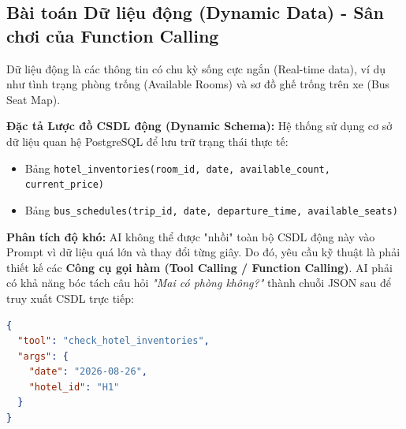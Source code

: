 \subsection{Bài toán Dữ liệu động (Dynamic Data) - Sân chơi của Function Calling}
Dữ liệu động là các thông tin có chu kỳ sống cực ngắn (Real-time data), ví dụ như tình trạng phòng trống (Available Rooms) và sơ đồ ghế trống trên xe (Bus Seat Map).

\textbf{Đặc tả Lược đồ CSDL động (Dynamic Schema):} Hệ thống sử dụng cơ sở dữ liệu quan hệ PostgreSQL để lưu trữ trạng thái thực tế:
\begin{itemize}
    \item Bảng \texttt{hotel\_inventories(room\_id, date, available\_count, current\_price)}
    \item Bảng \texttt{bus\_schedules(trip\_id, date, departure\_time, available\_seats)}
\end{itemize}

\textbf{Phân tích độ khó:} AI không thể được "nhồi" toàn bộ CSDL động này vào Prompt vì dữ liệu quá lớn và thay đổi từng giây. Do đó, yêu cầu kỹ thuật là phải thiết kế các \textbf{Công cụ gọi hàm (Tool Calling / Function Calling)}. AI phải có khả năng bóc tách câu hỏi \textit{"Mai có phòng không?"} thành chuỗi JSON sau để truy xuất CSDL trực tiếp:
\begin{lstlisting}[language=json]
{
  "tool": "check_hotel_inventories",
  "args": {
    "date": "2026-08-26",
    "hotel_id": "H1"
  }
}
\end{lstlisting}
